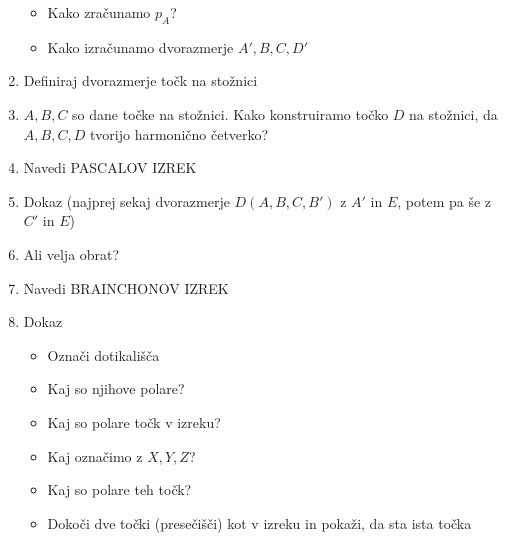 \documentclass{article}
\begin{document}
\begin{enumerate}
\begin{itemize}
            \item Kako zračunamo $p_A$?
            \item Kako izračunamo dvorazmerje $A', B, C, D'$
        \end{itemize}
        \item Definiraj dvorazmerje točk na stožnici
        \item $A, B, C$ so dane točke na stožnici. Kako konstruiramo točko $D$ na stožnici, da $A, B, C, D$ tvorijo harmonično četverko?
        \item Navedi PASCALOV IZREK
        \item Dokaz (najprej sekaj dvorazmerje $D(A, B, C, B')$ z $A'$ in $E$, potem pa še z $C'$ in $E$)
        \item Ali velja obrat?
        \item Navedi BRAINCHONOV IZREK
        \item Dokaz
        \begin{itemize}
            \item Označi dotikališča
            \item Kaj so njihove polare?
            \item Kaj so polare točk v izreku?
            \item Kaj označimo z $X, Y, Z$?
            \item Kaj so polare teh točk?
            \item Dokoči dve točki (presečišči) kot v izreku in pokaži, da sta ista točka
        \end{itemize}
    \end{enumerate}
\end{document}
